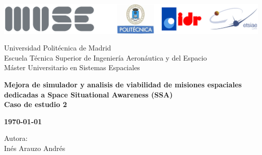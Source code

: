 \documentclass{article}
\numberwithin{equation}{section}
\numberwithin{equation}{subsection}
\begin{document}
\begin{center}
    \thispagestyle{empty}

    \includegraphics[width=16.5cm]{Images Document/Logo_portada.png} \\

    \vspace{1cm}

    \Large{Universidad Politécnica de Madrid \\
        \vspace{0.35cm}
        Escuela Técnica Superior de Ingeniería Aeronáutica y del Espacio \\
        \vspace{0.35cm}
        Máster Universitario en Sistemas Espaciales \\}

    \begin{center}
        \vspace{2 cm}
        {\bfseries\Huge Mejora de simulador y analisis de viabilidad de misiones espaciales dedicadas a Space Situational Awareness (SSA) \\}
        \vspace{1 cm}
        \textbf{Caso de estudio 2 \\}
        \vspace{0.5cm}

        {\large{\textbf{\today}}}

        \vfill
        {\Large Autora: \\
            Inés Arauzo Andrés \\
        }


    \end{center}
\end{center}

\thispagestyle{empty}

\newpage
{} %


\tableofcontents


\setlength{\parskip}{4mm}
\setlength{\parindent}{20pt}
\setlength{\headheight}{16.07225pt}

\newpage
{}



\newpage

\newpage

\newpage



\newpage
\clearpage


\newpage
\clearpage

% 
\end{document}
